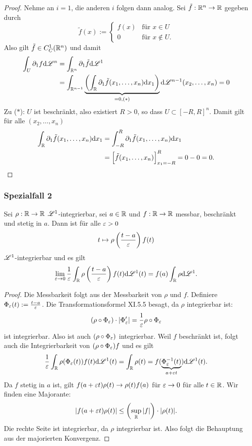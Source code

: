 \begin{proof}
 Nehme an $i=1$, die anderen $i$ folgen dann analog. Sei $\tilde{f}:\mathbb{R}^n \to \mathbb{R}$ gegeben durch 
 \[ \tilde{f}(x) := \begin{cases} f(x) &\text{für } x \in U \\ 0 &\text{für } x \notin U. \end{cases} \]
 Also gilt $\tilde{f} \in C^1_C(\mathbb{R}^n)$ und damit
 \[ \begin{aligned}
     \int_U \partial_1 f \mathrm{d} \mathscr{L}^n 
     &= \int_{\mathbb{R}^n} \partial_1 \tilde{f} \mathrm{d} \mathscr{L}^1 \\
     &= \int_{\mathbb{R}^{n-1}} \underbrace{ \left( \int_{\mathbb{R}} \partial_1 \tilde{f}(x_1, \ldots, x_n) \mathrm{d} x_1 \right) }_{=0, (*)} \mathrm{d} \mathscr{L}^{n-1}(x_2, \ldots, x_n) = 0 
    \end{aligned} \]
 Zu ($*$): $U$ ist beschränkt, also existiert $R >0$, so dass $U \subset [-R,R]^n$. Damit gilt für alle $(x_2, \ldots, x_n)$
 \begin{align*}
  \int_{\mathbb{R}} \partial_1 \tilde{f}(x_1, \ldots, x_n) \mathrm{d} x_1
  &= \int_{-R}^R \partial_1 \tilde{f} (x_1, \ldots, x_n) \mathrm{d} x_1 \\
  &= \Big[ \tilde{f} (x_1, \ldots, x_n) \Big]_{x_1 = -R}^R = 0 - 0 = 0. \qedhere
 \end{align*}
\end{proof}


\subsubsection{Spezialfall 2}
\begin{lem}
 Sei $\rho : \mathbb{R} \to \mathbb{R}$ $\mathscr{L}^1$-integrierbar, sei $a \in \mathbb{R}$ und $f: \mathbb{R} \to \mathbb{R}$ messbar, beschränkt und stetig in $a$. Dann ist für alle $\varepsilon > 0$
 \[ t \mapsto \rho \left( \frac{t-a}{\varepsilon} \right) f(t) \]
 $\mathscr{L}^1$-integrierbar und es gilt
 \[ \lim_{\varepsilon \to 0} \frac{1}{\varepsilon} \int_{\mathbb{R}} \rho \left( \frac{t-a}{\varepsilon} \right) f(t) \mathrm{d} \mathscr{L}^1(t) = f(a) \int_{\mathbb{R}} \rho \mathrm{d} \mathscr{L}^1. \]
\end{lem}

\begin{proof}
 Die Messbarkeit folgt aus der Messbarkeit von $\rho$ und $f$. Definiere $\Phi_\varepsilon(t) := \frac{t-a}{\varepsilon}$. Die Transformationsformel XI.5.5 besagt, da $\rho$ integrierbar ist:
 \[ (\rho \circ \Phi_\varepsilon ) \cdot | \Phi'_\varepsilon | = \frac{1}{\varepsilon} \rho \circ \Phi_\varepsilon \]
 ist integrierbar. Also ist auch $(\rho \circ \Phi_\varepsilon)$ integrierbar. Weil $f$ beschränkt ist, folgt auch die Integrierbarkeit von $(\rho \circ \Phi_\varepsilon) f$ und es gilt
 \[ \frac{1}{\varepsilon} \int_{\mathbb{R}} \rho( \Phi_\varepsilon(t) ) f(t) \mathrm{d} \mathscr{L}^1(t) =
    \int_{\mathbb{R}} \rho(t) = f( \underbrace{\Phi^{-1}_\varepsilon (t)}_{a + \varepsilon t} ) \mathrm{d} \mathscr{L}^1 (t). \]
 Da $f$ stetig in $a$ ist, gilt $f(a + \varepsilon t) \rho(t) \to \rho(t) f(a)$ für $\varepsilon \to 0$ für alle $t \in \mathbb{R}$. Wir finden eine Majorante:
 \[ | f(a+\varepsilon t) \rho(t) | \le \left( \sup_{\mathbb{R}} |f| \right) \cdot | \rho(t) |. \]
 Die rechte Seite ist integrierbar, da $\rho$ integrierbar ist. Also folgt die Behauptung aus der majorierten Konvergenz.
\end{proof}

